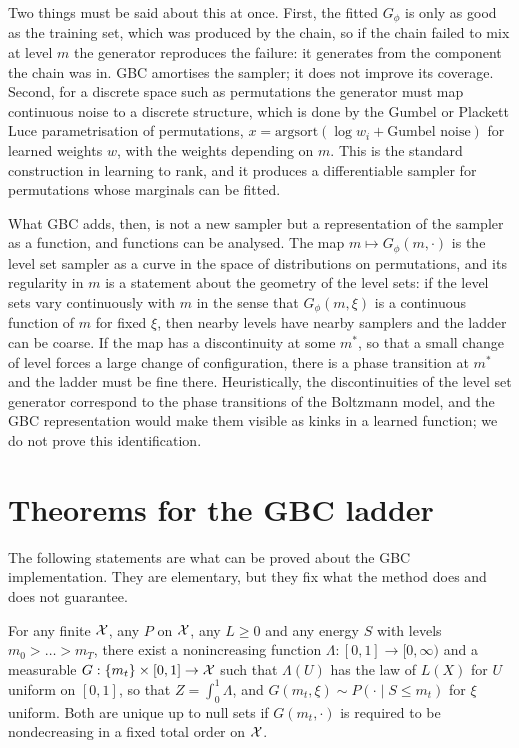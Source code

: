 Two things must be said about this at once. First, the fitted $G_\phi$ is only as good as the training set, which was produced by the chain, so if the chain failed to mix at level $m$ the generator reproduces the failure: it generates from the component the chain was in. GBC amortises the sampler; it does not improve its coverage. Second, for a discrete space such as permutations the generator must map continuous noise to a discrete structure, which is done by the Gumbel or Plackett Luce parametrisation of permutations, $x = \mathrm{argsort}(\log w_i + \text{Gumbel noise})$ for learned weights $w$, with the weights depending on $m$. This is the standard construction in learning to rank, and it produces a differentiable sampler for permutations whose marginals can be fitted.

What GBC adds, then, is not a new sampler but a representation of the sampler as a function, and functions can be analysed. The map $m \mapsto G_\phi(m, \cdot)$ is the level set sampler as a curve in the space of distributions on permutations, and its regularity in $m$ is a statement about the geometry of the level sets: if the level sets vary continuously with $m$ in the sense that $G_\phi(m, \xi)$ is a continuous function of $m$ for fixed $\xi$, then nearby levels have nearby samplers and the ladder can be coarse. If the map has a discontinuity at some $m^*$, so that a small change of level forces a large change of configuration, there is a phase transition at $m^*$ and the ladder must be fine there. Heuristically, the discontinuities of the level set generator correspond to the phase transitions of the Boltzmann model, and the GBC representation would make them visible as kinks in a learned function; we do not prove this identification.

\section{Theorems for the GBC ladder}

The following statements are what can be proved about the GBC implementation. They are elementary, but they fix what the method does and does not guarantee.

\begin{theorem}[Representation]
For any finite $\mathcal{X}$, any $P$ on $\mathcal{X}$, any $L \ge 0$ and any energy $S$ with levels $m_0 > \dots > m_T$, there exist a nonincreasing function $\Lambda : [0, 1] \to [0, \infty)$ and a measurable $G : \{ m_t \} \times [0, 1] \to \mathcal{X}$ such that $\Lambda(U)$ has the law of $L(X)$ for $U$ uniform on $[0, 1]$, so that $Z = \int_0^1 \Lambda$, and $G(m_t, \xi) \sim P(\cdot \mid S \le m_t)$ for $\xi$ uniform. Both are unique up to null sets if $G(m_t, \cdot)$ is required to be nondecreasing in a fixed total order on $\mathcal{X}$.
\end{theorem}


